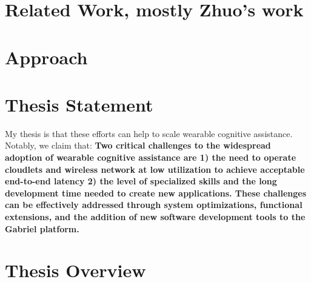 \section{Related Work, mostly Zhuo's work}
\section{Approach}
\section{Thesis Statement}

My thesis is that these efforts can help to scale wearable cognitive assistance.
Notably, we claim that:
\textbf{Two critical challenges to the widespread adoption of wearable cognitive
  assistance are 1) the need to operate cloudlets and wireless network at low
  utilization to achieve acceptable end-to-end latency 2) the level of specialized
  skills and the long development time needed to create new applications. These
  challenges can be effectively addressed through system optimizations,
  functional extensions, and the addition of new software development tools to
  the Gabriel platform.}

\section{Thesis Overview}
